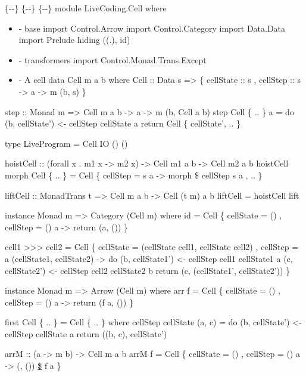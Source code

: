 \{-\protect\hypertarget{ux20LANGUAGEux20GADTsux20}{}{}-\}
\{-\protect\hypertarget{ux20LANGUAGEux20RankNTypesux20}{}{}-\}
\{-\protect\hypertarget{ux20LANGUAGEux20RecordWildCardsux20}{}{}-\}
module LiveCoding.Cell where

\begin{itemize}
\item
  - base import Control.Arrow import Control.Category import Data.Data
  import Prelude hiding ((.), id)
\item
  - transformers import Control.Monad.Trans.Except
\item
  - \textbar{} A cell data Cell m a b where Cell :: Data s
  =\textgreater{} \{ cellState :: s , cellStep :: s -\textgreater{} a
  -\textgreater{} m (b, s) \}
\end{itemize}

step :: Monad m =\textgreater{} Cell m a b -\textgreater{} a
-\textgreater{} m (b, Cell a b) step Cell \{ .. \} a = do (b,
cellState') \textless{}- cellStep cellState a return Cell \{ cellState',
.. \}

type LiveProgram = Cell IO () ()

hoistCell :: (forall x . m1 x -\textgreater{} m2 x) -\textgreater{} Cell
m1 a b -\textgreater{} Cell m2 a b hoistCell morph Cell \{ .. \} = Cell
\{ cellStep = s a -\textgreater{} morph \$ cellStep s a , .. \}

liftCell :: MonadTrans t =\textgreater{} Cell m a b -\textgreater{} Cell
(t m) a b liftCell = hoistCell lift

instance Monad m =\textgreater{} Category (Cell m) where id = Cell \{
cellState = () , cellStep = () a -\textgreater{} return (a, ()) \}

cell1 \textgreater{}\textgreater{}\textgreater{} cell2 = Cell \{
cellState = (cellState cell1, cellState cell2) , cellStep = a
(cellState1, cellState2) -\textgreater{} do (b, cellState1')
\textless{}- cellStep cell1 cellState1 a (c, cellState2') \textless{}-
cellStep cell2 cellState2 b return (c, (cellState1', cellState2')) \}

instance Monad m =\textgreater{} Arrow (Cell m) where arr f = Cell \{
cellState = () , cellStep = () a -\textgreater{} return (f a, ()) \}

first Cell \{ .. \} = Cell \{ .. \} where cellStep cellState (a, c) = do
(b, cellState') \textless{}- cellStep cellState a return ((b, c),
cellState')

arrM :: (a -\textgreater{} m b) -\textgreater{} Cell m a b arrM f = Cell
\{ cellState = () , cellStep = () a -\textgreater{} (, ()) \url{$} f a
\}

